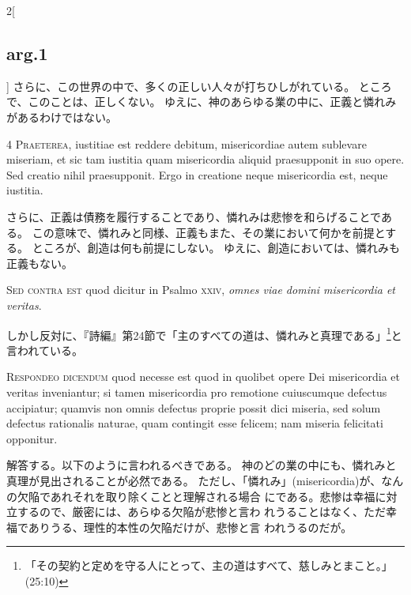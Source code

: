 \documentclass[paper=a4paper,fontsize=10pt,jafontsize=9pt,titlepage]{jlreq}
\begin{document}
\begin{paracol}{2}[\subsection{arg.1}]
さらに、この世界の中で、多くの正しい人々が打ちひしがれている。
ところで、このことは、正しくない。
ゆえに、神のあらゆる業の中に、正義と憐れみがあるわけではない。


{\scshape 4 Praeterea}, iustitiae est reddere debitum,
misericordiae autem sublevare miseriam, et sic tam iustitia quam
misericordia aliquid praesupponit in suo opere. Sed creatio nihil
praesupponit. Ergo in creatione neque misericordia est, neque iustitia.

\switchcolumn

さらに、正義は債務を履行することであり、憐れみは悲惨を和らげることである。
この意味で、憐れみと同様、正義もまた、その業において何かを前提とする。
ところが、創造は何も前提にしない。
ゆえに、創造においては、憐れみも正義もない。

\switchcolumn*[\subsection{s.c.}]

{\scshape Sed contra est} quod dicitur in Psalmo {\scshape xxiv},
{\itshape omnes viae domini misericordia et veritas}.

\switchcolumn

しかし反対に、『詩編』第24節で「主のすべての道は、憐れみと真理である」\footnote{「その契約と定めを守る人にとって、主の道はすべて、慈しみとまこと。」(25:10)}と
 言われている。


{\scshape Respondeo dicendum} quod necesse est quod in
quolibet opere Dei misericordia et veritas inveniantur; si tamen
misericordia pro remotione cuiuscumque defectus accipiatur; quamvis non
omnis defectus proprie possit dici miseria, sed solum defectus
rationalis naturae, quam contingit esse felicem; nam miseria felicitati
opponitur.

\switchcolumn

解答する。以下のように言われるべきである。
神のどの業の中にも、憐れみと真理が見出されることが必然である。
ただし、「憐れみ」(misericordia)が、なんの欠陥であれそれを取り除くことと理解される場合
 にである。悲惨は幸福に対立するので、厳密には、あらゆる欠陥が悲惨と言わ
 れうることはなく、ただ幸福でありうる、理性的本性の欠陥だけが、悲惨と言
 われうるのだが。


\end{paracol}
\end{document}

